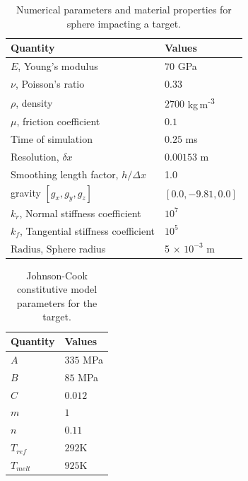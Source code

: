 \begin{table}[!ht]
  \centering
  \caption{Numerical parameters and material properties for sphere impacting a target.}%
  \label{tab:sphere-target-impact}
  \begin{tabular}[!ht]{ll}
    \toprule
    Quantity & Values\\
    \midrule
    $E$, Young's modulus & $70$ GPa \\
    $\nu$, Poisson's ratio & $0.33$ \\
    $\rho$, density & $2700$ kg\,m\textsuperscript{-3} \\
    $\mu$, friction coefficient & $0.1$ \\
    Time of simulation & $0.25$ ms \\
    Resolution, $\delta x$ & $0.00153$ m\\
    Smoothing length factor, $h/\Delta x$ & 1.0\\
    gravity $[g_x, g_y, g_z]$ & $[0.0, -9.81, 0.0]$\\
    $k_r$, Normal stiffness coefficient & $10^{7}$ \\
    $k_f$, Tangential stiffness coefficient & $10^{5}$ \\
    $\text{Radius}$, Sphere radius & 5 $\times$ $10^{-3}$ m\\
    \bottomrule
  \end{tabular}
\end{table}
\begin{table}[!ht]
  \centering
  \begin{tabular}[!ht]{ll}
    \toprule
    Quantity & Values\\
    \midrule
    $A$ & $335$ MPa \\
    $B$ & $85$ MPa \\
    $C$ & $0.012$ \\
    $m$ & $1$ \\
    $n$ & $0.11$ \\
    $T_{ref}$ & $292$K \\
    $T_{melt}$ & $925$K \\
    \bottomrule
  \end{tabular}
  \caption{Johnson-Cook constitutive model parameters for the target.}%
  \label{tab:sphere-target-impact-Johnson}
\end{table}

